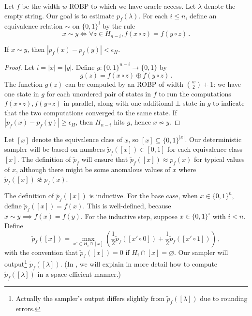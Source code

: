 Let $f$ be the width-$w$ ROBP to which we have oracle access. Let $\lambda$ denote the empty string. Our goal is to estimate $p_f(\lambda)$. For each $i \leq n$, define an equivalence relation $\sim$ on $\{0, 1\}^i$ by the rule
$$
x \sim y \iff \forall z \in H_{n - i}, f(x \circ z) = f(y \circ z)\,.
$$
\begin{lemma} \label{lem:equiv}
If $x \sim y$, then $|p_f(x) - p_f(y)| < \epsilon_H$.
\end{lemma}

\begin{proof}
Let $i = |x| = |y|$. Define $g \colon \{0, 1\}^{n - i} \to \{0, 1\}$ by
$$
g(z) = f(x \circ z) \oplus f(y \circ z)\,.
$$
The function $g(z)$ can be computed by an ROBP of width $\binom{w}{2} + 1$: we have one state in $g$ for each unordered pair of states in $f$ to run the computations $f(x \circ z), f(y \circ z)$ in parallel, along with one additional $\bot$ state in $g$ to indicate that the two computations converged to the same state. If $|p_f(x) - p_f(y)| \geq \epsilon_H$, then $H_{n - i}$ hits $g$, hence $x \not \sim y$.
\end{proof}

Let $[x]$ denote the equivalence class of $x$, so $[x] \subseteq \{0, 1\}^{|x|}$. Our deterministic sampler will be based on numbers $\widetilde{p}_f([x]) \in [0, 1]$ for each equivalence class $[x]$. The definition of $\widetilde{p}_f$ will ensure that $\widetilde{p}_f([x]) \approx p_f(x)$ for typical values of $x$, although there might be some anomalous values of $x$ where $\widetilde{p}_f([x]) \not \approx p_f(x)$.

The definition of $\widetilde{p}_f([x])$ is inductive. For the base case, when $x \in \{0, 1\}^n$, define $\widetilde{p}_f([x]) = f(x)$. This is well-defined, because $x \sim y \implies f(x) = f(y)$. For the inductive step, suppose $x \in \{0, 1\}^i$ with $i < n$. Define
\begin{equation} \label{eqn:tilde-p-def}
\widetilde{p}_f([x]) = \max_{x' \in H_i \cap [x]} \left(\frac{1}{2} \widetilde{p}_f([x' \circ 0]) + \frac{1}{2} \widetilde{p}_f([x' \circ 1])\right)\,,
\end{equation}
with the convention that $\widetilde{p}_f([x]) = 0$ if $H_i \cap [x] = \varnothing$. Our sampler will output\footnote{Actually the sampler's output differs slightly from $\widetilde{p}_f([\lambda])$ due to rounding errors.} $\widetilde{p}_f([\lambda])$. (In , we will explain in more detail how to compute $\widetilde{p}_f([\lambda])$ in a space-efficient manner.)

